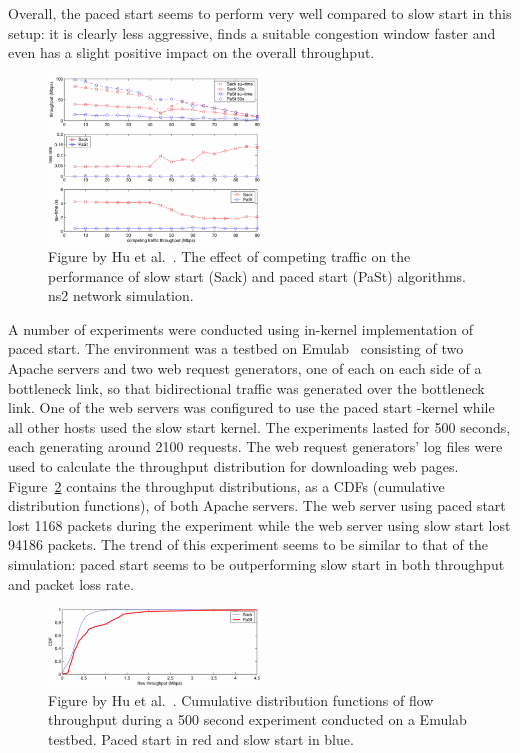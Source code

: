 Overall, the paced start seems to perform very well compared to slow start in this setup: it is clearly less aggressive, finds a suitable congestion window faster and even has a slight positive impact on the overall throughput.

\begin{figure}
	\includegraphics[width=0.5\textwidth]{images/hu03_competing_traffic.png}
	\caption{Figure by Hu et al.~\cite{Hu03}. The effect of competing traffic on the performance of slow start (Sack) and paced start (PaSt) algorithms. ns2 network simulation.}
	\label{fig:competing_traffic}
\end{figure}

A number of experiments were conducted using in-kernel implementation of paced start. The environment was a testbed on Emulab~\cite{Emulab} consisting of two Apache servers and two web request generators, one of each on each side of a bottleneck link, so that bidirectional traffic was generated over the bottleneck link. One of the web servers was configured to use the paced start -kernel while all other hosts used the slow start kernel. The experiments lasted for 500 seconds, each generating around 2100 requests. The web request generators' log files were used to calculate the throughput distribution for downloading web pages. Figure~\ref{fig:in_kernel} contains the throughput distributions, as a CDFs (cumulative distribution functions), of both Apache servers. The web server using paced start lost 1168 packets during the experiment while the web server using slow start lost 94186 packets. The trend of this experiment seems to be similar to that of the simulation: paced start seems to be outperforming slow start in both throughput and packet loss rate.

\begin{figure}
	\includegraphics[width=0.5\textwidth]{images/hu03_in_kernel.png}
	\caption{Figure by Hu et al.~\cite{Hu03}. Cumulative distribution functions of flow throughput during a 500 second experiment conducted on a Emulab testbed. Paced start in red and slow start in blue.}
	\label{fig:in_kernel}
\end{figure}





